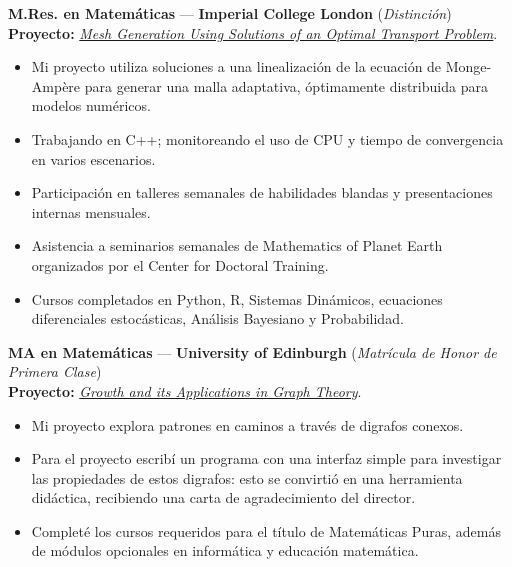 \documentclass[10pt]{article}
\newenvironment{innerlist}[1][\enskip\textbullet]{
	\begin{itemize}[#1,leftmargin=*,parsep=0pt,itemsep=1pt,topsep=2pt,partopsep=0pt]
}{\end{itemize}}
\begin{document}
\textbf{M.Res. en Matemáticas} — \textbf{Imperial College London} (\emph{Distinción})\\
\vspace{-2pt}
\hspace{2pt} \textbf{Proyecto:} \href{https://github.com/DrPrettyman/dissertations/blob/main/MresDiss_Prettyman.pdf}{\emph{Mesh Generation Using Solutions of an Optimal Transport Problem}}.
\vspace{4pt}
\begin{innerlist}
	\item Mi proyecto utiliza soluciones a una linealización de la ecuación de Monge-Ampère
		para generar una malla adaptativa, óptimamente distribuida para modelos numéricos.
	\item Trabajando en C++; monitoreando el uso de CPU y tiempo de convergencia en varios escenarios.
	\item Participación en talleres semanales de habilidades blandas y presentaciones internas mensuales.
	\item Asistencia a seminarios semanales de Mathematics of Planet Earth
		organizados por el Center for Doctoral Training.
	\item Cursos completados en Python, R, Sistemas Dinámicos,
		ecuaciones diferenciales estocásticas, Análisis Bayesiano y Probabilidad.
\end{innerlist}
\vspace{14pt}

\textbf{MA en Matemáticas} — \textbf{University of Edinburgh} (\emph{Matrícula de Honor de Primera Clase}) \\
\vspace{-2pt}
\hspace{2pt} \textbf{Proyecto:} \href{https://github.com/DrPrettyman/dissertations/blob/main/MaDiss_Prettyman.pdf}{\emph{Growth and its Applications in Graph Theory}}.
\vspace{4pt}
\begin{innerlist}
	\item Mi proyecto explora patrones en caminos a través de digrafos conexos.
	\item Para el proyecto escribí un programa con una interfaz simple para
		investigar las propiedades de estos digrafos: esto se convirtió en una herramienta didáctica,
		recibiendo una carta de agradecimiento del director.
	\item Completé los cursos requeridos para el título de Matemáticas Puras,
		además de módulos opcionales en informática y educación matemática.
\end{innerlist}
\end{document}
